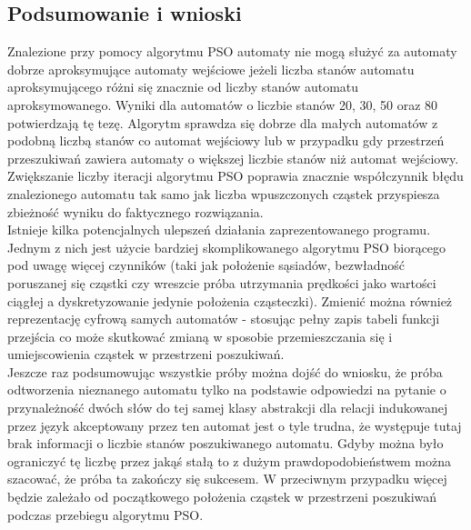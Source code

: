 \documentclass[runningheads,a4paper]{llncs}
\begin{document}
\FloatBarrier
\subsection{Podsumowanie i wnioski}

Znalezione przy pomocy algorytmu PSO automaty nie mogą służyć za automaty dobrze aproksymujące automaty wejściowe jeżeli liczba stanów automatu aproksymującego różni się znacznie od liczby stanów automatu aproksymowanego. Wyniki dla automatów o liczbie stanów 20, 30, 50 oraz 80 potwierdzają tę tezę. Algorytm sprawdza się dobrze dla małych automatów z podobną liczbą stanów co automat wejściowy lub w przypadku gdy przestrzeń przeszukiwań zawiera automaty o większej liczbie stanów niż automat wejściowy. Zwiększanie liczby iteracji algorytmu PSO poprawia znacznie współczynnik błędu znalezionego automatu tak samo jak liczba wpuszczonych cząstek przyspiesza zbieżność wyniku do faktycznego rozwiązania. \\

Istnieje kilka potencjalnych ulepszeń działania zaprezentowanego programu. Jednym z nich jest użycie bardziej skomplikowanego algorytmu PSO biorącego pod uwagę więcej czynników (taki jak położenie sąsiadów, bezwładność poruszanej się cząstki czy wreszcie próba utrzymania prędkości jako wartości ciągłej a dyskretyzowanie jedynie położenia cząsteczki). Zmienić można również reprezentację cyfrową samych automatów - stosując pełny zapis tabeli funkcji przejścia co może skutkować zmianą w sposobie przemieszczania się i umiejscowienia cząstek w przestrzeni poszukiwań. \\

Jeszcze raz podsumowując wszystkie próby można dojść do wniosku, że próba odtworzenia nieznanego automatu tylko na podstawie odpowiedzi na pytanie o przynależność dwóch słów do tej samej klasy abstrakcji dla relacji indukowanej przez język akceptowany przez ten automat jest o tyle trudna, że występuje tutaj brak informacji o liczbie stanów poszukiwanego automatu. Gdyby można było ograniczyć tę liczbę przez jakąś stałą to z dużym prawdopodobieństwem można szacować, że próba ta zakończy się sukcesem. W przeciwnym przypadku więcej będzie zależało od początkowego położenia cząstek w przestrzeni poszukiwań podczas przebiegu algorytmu PSO.
\end{document}
